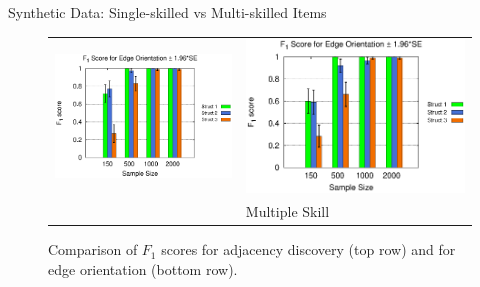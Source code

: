 \documentclass[hyperref={pdfpagelabels=false}]{beamer}
\begin{document}
\begin{frame}{Synthetic Data: Single-skilled vs Multi-skilled Items}
\begin{figure}[ht]
\begin{center}
\begin{tabular}{>{\centering}m{1.5in} >{\centering\arraybackslash}m{1.5in}}
				\includegraphics[width=1.1\linewidth]{figures/F1O_single.eps} &\includegraphics[width=1.1\linewidth]{figures/F1O_multi.eps}\\
				{\small Single Skill}& {\small Multiple Skill}
			\end{tabular}
		\end{center}
		\caption{\footnotesize Comparison of $F_1$ scores for adjacency discovery (top row) and for edge orientation (bottom row). 
			} 
		\label{fig:f1-single-multi}
	\end{figure} 
\end{frame}
\end{document}
